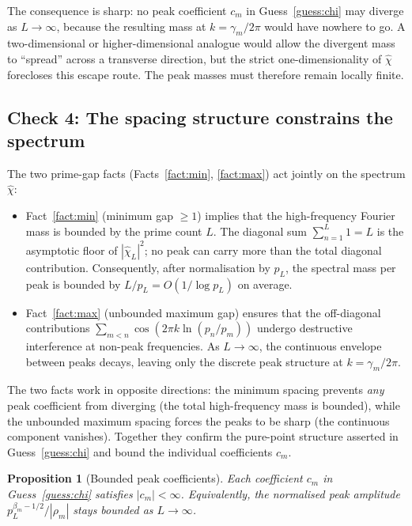 \documentclass[11pt, oneside]{article}
\newtheorem{proposition}[theorem]{Proposition}
\theoremstyle{definition}
\begin{document}
The consequence is sharp: no peak coefficient $c_m$ in
Guess~\ref{guess:chi} may diverge as $L \to \infty$, because
the resulting mass at $k = \gamma_m/2\pi$ would have nowhere
to go. A two-dimensional or higher-dimensional analogue would
allow the divergent mass to ``spread'' across a transverse
direction, but the strict one-dimensionality of $\hat\chi$
forecloses this escape route. The peak masses must therefore
remain locally finite.

\subsection{Check 4: The spacing structure constrains the
            spectrum}
\label{app:check4}

The two prime-gap facts (Facts~\ref{fact:min},
\ref{fact:max}) act jointly on the spectrum $\hat\chi$:
\begin{itemize}
  \item Fact~\ref{fact:min} (minimum gap $\ge 1$) implies that
        the high-frequency Fourier mass is bounded by the
        prime count $L$. The diagonal sum
        $\sum_{n=1}^L 1 = L$ is the asymptotic floor of
        $|\hat\chi_L|^2$; no peak can carry more than the total
        diagonal contribution. Consequently, after
        normalisation by $p_L$, the spectral mass per peak is
        bounded by $L/p_L = O(1/\log p_L)$ on average.
  \item Fact~\ref{fact:max} (unbounded maximum gap) ensures
        that the off-diagonal contributions
        $\sum_{m<n}\cos(2\pi k\ln(p_n/p_m))$ undergo destructive
        interference at non-peak frequencies. As $L \to
        \infty$, the continuous envelope between peaks
        decays, leaving only the discrete peak structure at
        $k = \gamma_m/2\pi$.
\end{itemize}
The two facts work in opposite directions: the minimum spacing
prevents \emph{any} peak coefficient from diverging (the total
high-frequency mass is bounded), while the unbounded maximum
spacing forces the peaks to be sharp (the continuous component
vanishes). Together they confirm the pure-point structure
asserted in Guess~\ref{guess:chi} and bound the individual
coefficients $c_m$.

\begin{proposition}[Bounded peak coefficients]
\label{prop:bounded}
Each coefficient $c_m$ in Guess~\ref{guess:chi} satisfies
$|c_m| < \infty$. Equivalently, the normalised peak amplitude
$p_L^{\beta_m - 1/2}/|\rho_m|$ stays bounded as
$L \to \infty$.
\end{proposition}
\end{document}
